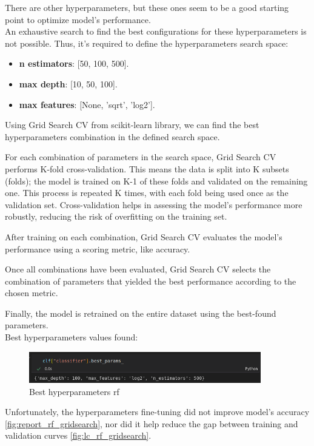 \documentclass[a4paper,12pt]{article}
\begin{document}
There are other hyperparameters, but these ones seem to be a good starting point to optimize model's performance.\\

An exhaustive search to find the best configurations for these hyperparameters is not possible. Thus, it's required to define the hyperparameters search space:
\begin{itemize}
    \item \textbf{n estimators}: [50, 100, 500].
    \item \textbf{max depth}: [10, 50, 100].
    \item \textbf{max features}: [None, 'sqrt', 'log2'].
\end{itemize}

Using Grid Search CV from scikit-learn library, we can find the best hyperparameters combination in the defined search space.

For each combination of parameters in the search space, Grid Search CV performs K-fold cross-validation. This means the data is split into K subsets (folds); the model is trained on K-1 of these folds and validated on the remaining one. This process is repeated K times, with each fold being used once as the validation set. Cross-validation helps in assessing the model's performance more robustly, reducing the risk of overfitting on the training set.

After training on each combination, Grid Search CV evaluates the model's performance using a scoring metric, like accuracy.

Once all combinations have been evaluated, Grid Search CV selects the combination of parameters that yielded the best performance according to the chosen metric.

Finally, the model is retrained on the entire dataset using the best-found parameters.\\

Best hyperparameters values found:
\begin{figure}[H]
  \centering
  \includegraphics[width=0.9\textwidth]{./images/best_params.png}
  \caption{Best hyperparameters rf}
  \label{fig:best_params_rf}
\end{figure}

Unfortunately, the hyperparameters fine-tuning did not improve model's accuracy \ref{fig:report_rf_gridsearch}, nor did it help reduce the gap between training and validation curves \ref{fig:lc_rf_gridsearch}. 
\end{document}
